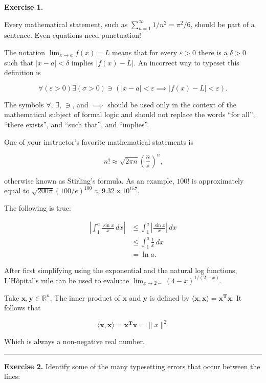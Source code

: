 \documentclass{report}
\begin{document}
\textbf{Exercise 1.}

\quad Every mathematical statement, such as $\sum^{\infty}_{n=1} 1/n^{2} = \pi^{2}/6$, should be part of a sentence. Even equations need punctuation!

\quad The notation $\displaystyle{\lim_{x \to a}f(x) = L}$ means that for every $\varepsilon{} > 0$ there is a $\delta{} > 0$ such that $|x - a| < \delta$ implies $|f(x) - L|$. An incorrect way to typeset this definition is

\[ \forall(\varepsilon > 0)\exists(\sigma{} > 0) \ni{} (|x - a| < \varepsilon{} \implies{} |f(x) - L| < \varepsilon) \text{.}\]

The symbols $\forall$, $\exists$, $\ni$, and $\implies{}$ should be used only in the context of the mathematical subject of formal logic and should not replace the words ``for all'', ``there exists'', and ``such that'', and ``implies''.

One of your instructor's favorite mathematical statements is

\[ n! \approx{} \sqrt{2\pi n}\left ( \frac{n}{e} \right )^{n} \text{,}\]

otherwise known as Stirling's formula. As an example, $100!$ is approximately equal to $\sqrt{200\pi}(100/e)^{100} \approx{} 9.32 \times{} 10^{157}$.

\quad The following is true:

\begin{align*}
	\left | \int_{1}^{a} \frac{\sin{x}}{x}\,dx \right |
	& \leq{} \int_{1}^{a} \left | \frac{\sin{x}}{x} \right | \, dx \\
	& \leq \int_{1}^{a}\frac{1}{x}\,dx \\
	& = \ln a\text{.}
\end{align*}

\quad After first simplifying using the exponential and the natural log functions, L'H\^{o}pital's rule can be used to evaluate $\displaystyle{\lim_{x \to 2 -}(4 - x)^{1/(2-x)}}$.

Take $\mathbf{x, y} \in{} \mathbb{R}^{n}$. The inner product of $\mathbf{x}$ and $\mathbf{y}$ is defined by $\langle \mathbf{x}, \mathbf{x} \rangle = \mathbf{x^{T}x}$. It follows that

\[ \langle \mathbf{x}, \mathbf{x}\rangle = \mathbf{x^{T}x} = \|x\|^{2} \]

Which is always a non-negative real number.

\rule{\textwidth}{0.01ex}

\textbf{Exercise 2.} Identify some of the many typesetting errors that occur between the lines:
\end{document}
